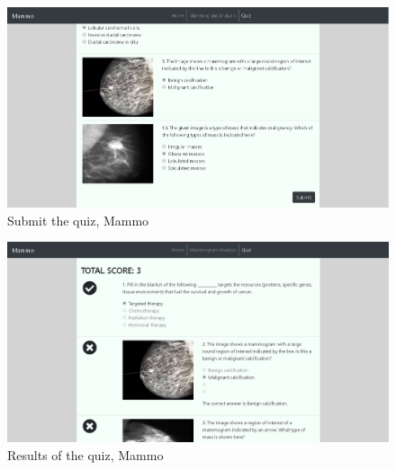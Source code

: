 \begin{figure}[h]
	\centering
  	\includegraphics[scale=0.5]{images/submitQuiz.png}
	 \caption{Submit the quiz, Mammo}
  	\label{fig:submitQuiz}
\end{figure}

\begin{figure}[h]
	\centering
  	\includegraphics[scale=0.5]{images/quizResults.png}
	 \caption{Results of the quiz, Mammo}
  	\label{fig:quizResults}
\end{figure}

\clearpage
\clearpage